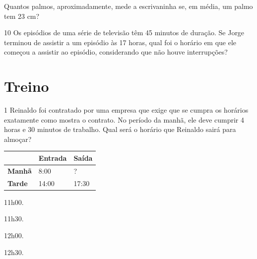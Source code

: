 \begin{escolha}
\item Quantos palmos,
aproximadamente, mede a escrivaninha se, em média, um palmo tem 23 cm?\\
\end{escolha}

\num{10} Os episódios de uma série de televisão têm 45 minutos de duração.
Se Jorge terminou de assistir a um episódio às 17 horas, qual foi o
horário em que ele começou a assistir ao episódio, considerando que não houve interrupções?


\pagebreak
\section*{Treino}

\num{1} Reinaldo foi contratado por uma empresa que exige que se cumpra os horários exatamente como mostra o contrato. No período da manhã, ele deve
cumprir 4 horas e 30 minutos de trabalho. Qual será o horário que
Reinaldo sairá para almoçar?

\begin{longtable}[]{@{}lll@{}}
\toprule
& \textbf{Entrada} & \textbf{Saída}\tabularnewline
\midrule
\endhead
\hline
\textbf{Manhã} & 8:00 & ?\tabularnewline
\hline
\textbf{Tarde} & 14:00 & 17:30\tabularnewline
\hline
\bottomrule
\end{longtable}

\begin{escolha}
\begin{multicols}{2}

\item 11h00.

\item 11h30.
\end{multicols}


\begin{multicols}{2}

\item 12h00.

\item 12h30.
\end{multicols}
\end{escolha}


